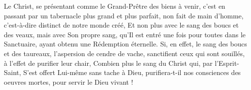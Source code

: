 Le Christ, se présentant comme le Grand-Prêtre des biens à venir, c'est en passant par un tabernacle plus grand et plus parfait, non fait de main d'homme, c'est-à-dire distinct de notre monde créé,
Et non plus avec le sang des boucs et des veaux, mais avec Son propre sang, qu'Il est entré une fois pour toutes dans le Sanctuaire, ayant obtenu une Rédemption éternelle.
Si, en effet, le sang des boucs et des taureaux, l'aspersion de cendre de vache, sanctifient ceux qui sont souillés, à l'effet de purifier leur chair,
Combien plus le sang du Christ qui, par l'Esprit-Saint, S'est offert Lui-même sans tache à Dieu, purifiera-t-il nos consciences des oeuvres mortes, pour servir le Dieu vivant !
